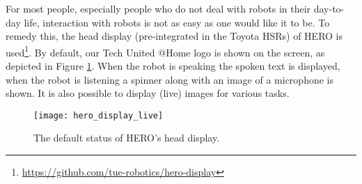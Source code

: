 \label{ssec:display}
For most people, especially people who do not deal with robots in their day-to-day life, interaction with robots is not as easy as one would like it to be.
To remedy this, the head display (pre-integrated in the Toyota HSRs) of HERO is used\footnote{\url{https://github.com/tue-robotics/hero-display}}.
By default, our Tech United @Home logo is shown on the screen, as depicted in Figure \ref{fig:hero_display}. When the robot is speaking the spoken text is displayed, when the robot is listening a spinner along with an image of a microphone is shown.
It is also possible to display (live) images for various tasks.
\begin{figure}[H]
    \centering
	\texttt{[image: hero\_display\_live]}
	\caption{
		The default status of HERO's head display.}
	\label{fig:hero_display}
\end{figure}
